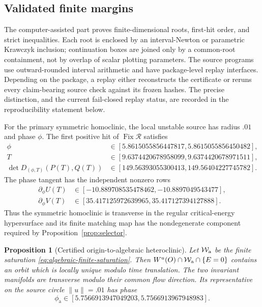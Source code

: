 \documentclass[11pt]{amsart}
\numberwithin{equation}{section}
\newtheorem{proposition}[theorem]{Proposition}
\theoremstyle{definition}
\theoremstyle{remark}
\newcommand{\cR}{\mathcal R}
\newcommand{\Fix}{\operatorname {Fix}}
\begin{document}
\subsection{Validated finite margins}

The computer-assisted part proves finite-dimensional roots, first-hit
order, and strict inequalities.  Each root is enclosed by an
interval-Newton or parametric Krawczyk inclusion; continuation boxes are
joined only by a common-root containment, not by overlap of scalar plotting
parameters.  The source programs use outward-rounded interval arithmetic
and have package-level replay interfaces.  Depending on the package, a
replay either reconstructs the certificate or reruns every claim-bearing
source check against its frozen hashes.  The precise distinction, and the
current fail-closed replay status, are recorded in the reproducibility
statement below.

For the primary symmetric homoclinic, the local unstable source has radius
$.01$ and phase $\phi$.  The first positive hit of $\Fix\cR$ satisfies
\begin{align}
 \phi&\in[5.8615055856447817,5.8615055856450482],
 \label{eq:hom-phase}\\
 T&\in[9.6374420678958099,9.6374420678971511],
 \label{eq:hom-time}\\
 \det D_{(\phi,T)}(P(T),Q(T))
 &\in[149.56393055300413,149.56404227745782].
 \label{eq:hom-det}
\end{align}
The phase tangent has the independent nonzero rows
\begin{align}
 \partial_\phi U(T)&\in
 [-10.889708535478462,-10.8897049543477],
 \label{eq:hom-tangent-U}\\
 \partial_\phi V(T)&\in
 [35.417125972639965,35.417127394127888].
 \label{eq:hom-tangent-V}
\end{align}
Thus the symmetric homoclinic is transverse in the regular critical-energy
hypersurface and its finite matching map has the nondegenerate component required by
Proposition~\ref{prop:selector}.

\begin{proposition}[Certified origin-to-algebraic heteroclinic]
\label{prop:core-origin-algebraic}
Let $\mathcal W_{\rm a}$ be the finite saturation
\eqref{eq:algebraic-finite-saturation}.  Then
$W^u(O)\cap\mathcal W_{\rm a}\cap\{E=0\}$ contains an orbit which is
locally unique modulo time translation.  The two invariant manifolds are
transverse modulo their common flow direction.  Its representative on the
source circle $\|u\|=.01$ has phase
\begin{equation}\label{eq:alg-source-phase}
 \phi_{\mathrm a}\in
 [5.7566913947049203,5.7566913967948983].
\end{equation}
\end{proposition}
\end{document}
